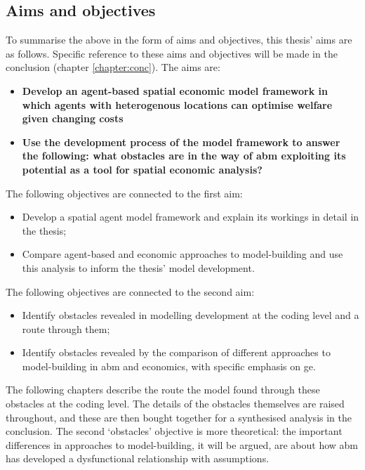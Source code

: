 \subsection{Aims and objectives \label{sec:aims}}

To summarise the above in the form of aims and objectives, this thesis' aims are as follows. Specific reference to these aims and objectives will be made in the conclusion (chapter \ref{chapter:conc}). The aims are:

\begin{itemize}
\item \textbf{Develop an agent-based spatial economic model framework in which agents with heterogenous locations can optimise welfare given changing costs}
\item \textbf{Use the development process of the model framework to answer the following: what obstacles are in the way of \gls{abm} exploiting its potential as a tool for spatial economic analysis?}
\end{itemize}

The following objectives are connected to the first aim:

\begin{itemize}
	\item Develop a spatial agent model framework and explain its workings in detail in the thesis;
	\item Compare agent-based and economic approaches to model-building and use this analysis to inform the thesis' model development.
\end{itemize}

The following objectives are connected to the second aim:

\begin{itemize}
	\item Identify obstacles revealed in modelling development at the coding level and a route through them;
	\item Identify obstacles revealed by the comparison of different approaches to model-building in \gls{abm} and economics, with specific emphasis on \gls{ge}.
\end{itemize}

The following chapters describe the route the model found through these obstacles at the coding level. The details of the obstacles themselves are raised throughout, and these are then bought together for a synthesised analysis in the conclusion. The second `obstacles' objective is more theoretical: the important differences in approaches to model-building, it will be argued, are about how \gls{abm} has developed a dysfunctional relationship with assumptions.

